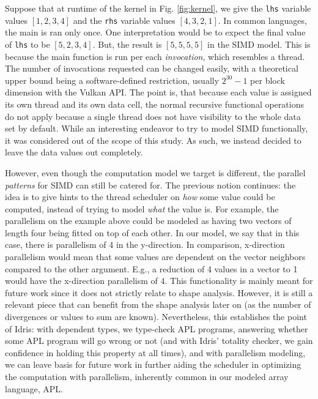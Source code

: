 \documentclass{report}
\begin{document}
Suppose that at runtime of the kernel in Fig. \ref{fig:kernel}, we give the \verb|lhs| variable values $[1,2,3,4]$ and the \verb|rhs| variable values $[4,3,2,1]$. In common languages, the main is ran only once. One interpretation would be to expect the final value of \verb|lhs| to be $[5, 2, 3, 4]$. But, the result is $[5, 5, 5, 5]$ in the SIMD model. This is because the main function is run per each \textit{invocation}, which resembles a thread. The number of invocations requested can be changed easily, with a theoretical upper bound being a software-defined restriction, usually $2^{30}-1$ per block dimension with the Vulkan \gls{API}. The point is, that because each value is assigned its own thread and its own data cell, the normal recursive functional operations do not apply because a single thread does not have visibility to the whole data set by default. While an interesting endeavor to try to model SIMD functionally, it was considered out of the scope of this study. As such, we instead decided to leave the data values out completely.

However, even though the computation model we target is different, the parallel \emph{patterns} for SIMD can still be catered for. The previous notion continues: the idea is to give hints to the thread scheduler on \emph{how} some value could be computed, instead of trying to model \emph{what} the value is. For example, the parallelism on the example above could be modeled as having two vectors of length four being fitted on top of each other. In our model, we say that in this case, there is parallelism of 4 in the y-direction. In comparison, x-direction parallelism would mean that some values are dependent on the vector neighbors compared to the other argument. E.g., a reduction of 4 values in a vector to 1 would have the x-direction parallelism of 4. This functionality is mainly meant for future work since it does not strictly relate to shape analysis. However, it is still a relevant piece that can benefit from the shape analysis later on (as the number of divergences or values to sum are known). Nevertheless, this establishes the point of Idris: with dependent types, we type-check APL programs, answering whether some APL program will go wrong or not (and with Idris' totality checker, we gain confidence in holding this property at all times), and with parallelism modeling, we can leave basis for future work in further aiding the scheduler in optimizing the computation with parallelism, inherently common in our modeled array language, APL.
\end{document}
